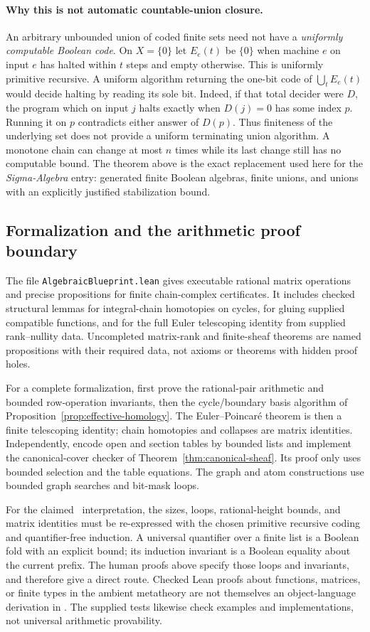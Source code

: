 \paragraph{Why this is not automatic countable-union closure.}
An arbitrary unbounded union of coded finite sets need not have a
\emph{uniformly computable Boolean code}.  On $X=\{0\}$ let $E_e(t)$
be $\{0\}$ when machine $e$ on input $e$ has halted within $t$ steps and empty
otherwise.  This is uniformly primitive recursive.  A uniform algorithm
returning the one-bit code of $\bigcup_t E_e(t)$ would decide halting by
reading its sole bit.  Indeed, if that total decider were $D$, the program
which on input $j$ halts exactly when $D(j)=0$ has some index $p$.
Running it on $p$ contradicts either answer of $D(p)$.  Thus finiteness of the underlying set does not
provide a uniform terminating union algorithm.  A monotone chain can
change at most $n$ times while its last change still has no computable
bound.  The theorem above is the exact replacement used here for the
\emph{Sigma-Algebra} entry: generated finite Boolean algebras, finite
unions, and unions with an explicitly justified stabilization bound.

\subsection{Formalization and the arithmetic proof boundary}

The file \texttt{AlgebraicBlueprint.lean} gives executable rational
matrix operations and precise propositions for finite chain-complex
certificates.  It includes checked structural lemmas for integral-chain
homotopies on cycles, for gluing supplied compatible functions, and for
the full Euler telescoping identity from supplied rank--nullity data.
Uncompleted matrix-rank and finite-sheaf
theorems are named propositions with their required data, not axioms or
theorems with hidden proof holes.

For a complete formalization, first prove the rational-pair arithmetic
and bounded row-operation invariants, then the cycle/boundary basis
algorithm of Proposition~\ref{prop:effective-homology}.  The
Euler--Poincar\'e theorem is then a finite telescoping identity; chain
homotopies and collapses are matrix identities.  Independently, encode
open and section tables by bounded lists and implement the canonical-cover
checker of Theorem~\ref{thm:canonical-sheaf}.  Its proof only uses bounded
selection and the table equations.  The graph and atom constructions
use bounded graph searches and bit-mask loops.

For the claimed \ipra\ interpretation, the sizes, loops, rational-height
bounds, and matrix identities must be re-expressed with the chosen
primitive recursive coding and quantifier-free induction.  A universal
quantifier over a finite list is a Boolean fold with an explicit bound;
its induction invariant is a Boolean equality about the current prefix.
The human proofs above specify those loops and invariants, and therefore
give a direct route.  Checked Lean proofs about functions, matrices, or
finite types in the ambient metatheory are not themselves an
object-language derivation in \ipra.  The supplied tests likewise check
examples and implementations, not universal arithmetic provability.
